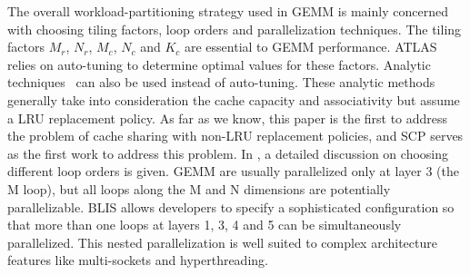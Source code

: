 The overall workload-partitioning strategy used in
GEMM is mainly concerned with choosing 
tiling factors, loop orders and parallelization
techniques.
The tiling factors $M_r$, $N_r$, $M_c$, $N_c$ and $K_c$
are essential to GEMM performance.
ATLAS~\cite{atlas} relies on auto-tuning to determine optimal
values for these factors.
Analytic techniques~\cite{analytic1,analytic2,blisanalytic} 
can also be used instead of auto-tuning.
These analytic methods generally take into consideration
the cache capacity and associativity
but assume a LRU replacement policy.
As far as we know, this paper is the first to
address the problem of cache sharing with non-LRU replacement policies,
and SCP serves as the first work to address this problem.
In \cite{gotogemm}, a detailed discussion on
choosing
different loop orders is given.
GEMM are usually parallelized only at
layer 3 (the M loop),
but all loops along the M and N dimensions are potentially parallelizable.
BLIS\cite{blispar} allows developers to specify a sophisticated configuration
so 
that more than one loops at layers 1, 3, 4 and 5
can be simultaneously parallelized.
This nested parallelization is well suited to complex architecture features
like multi-sockets and hyperthreading. 

